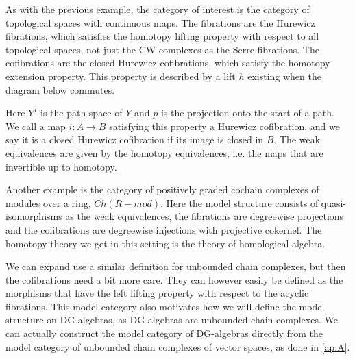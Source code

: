 \begin{example}
\label{ex:strom_model}
As with the previous example, the category of interest is the category of topological spaces with continuous maps. The fibrations are the Hurewicz fibrations, which satisfies the homotopy lifting property with respect to all topological spaces, not just the CW complexes as the Serre fibrations. The cofibrations are the closed Hurewicz cofibrations, which satisfy the homotopy extension property. This property is described by a lift $h$ existing when the diagram below commutes.

\begin{center}
\end{center}

Here $Y^I$ is the path space of $Y$ and $p$ is the projection onto the start of a path. We call a map $i:A\longrightarrow B$ satisfying this property a Hurewicz cofibration, and we say it is a closed Hurewicz cofibration if its image is closed in $B$. The weak equivalences are given by the homotopy equivalences, i.e. the maps that are invertible up to homotopy.  
\end{example}

\begin{example}
\label{ex:cochain_complexes}
Another example is the category of positively graded cochain complexes of modules over a ring, $Ch(R-mod)$. Here the model structure consists of quasi-isomorphisms as the weak equivalences, the fibrations are degreewise projections and the cofibrations are degreewise injections with projective cokernel. The homotopy theory we get in this setting is the theory of homological algebra. 

We can expand use a similar definition for unbounded chain complexes, but then the cofibrations need a bit more care. They can however easily be defined as the morphisms that have the left lifting property with respect to the acyclic fibrations. This model category also motivates how we will define the model structure on DG-algebras, as DG-algebras are unbounded chain complexes. We can actually construct the model category of DG-algebras directly from the model category of unbounded chain complexes of vector spaces, as done in \cref{ap:A}. 
\end{example}


